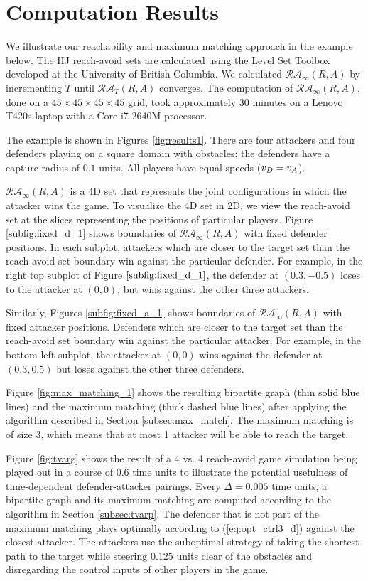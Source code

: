 \section{Computation Results}
\label{sec:results}
We illustrate our reachability and maximum matching approach in the example below. The HJ reach-avoid sets are calculated using the Level Set Toolbox \cite{LSToolbox} developed at the University of British Columbia. We calculated $\mathcal{RA}_\infty(R,A)$ by incrementing $T$ until $\mathcal{RA}_T(R,A)$ converges. The computation of $\mathcal{RA}_\infty(R,A)$, done on a $45\times45\times45\times45$ grid, took approximately 30 minutes on a Lenovo T420s laptop with a Core i7-2640M processor. 

The example is shown in Figures \ref{fig:results1}. There are four attackers and four defenders playing on a square domain with obstacles; the defenders have a capture radius of $0.1$ units. All players have equal speeds ($v_D=v_A$). 

$\mathcal{RA}_\infty(R,A)$ is a 4D set that represents the joint configurations in which the attacker wins the game. To visualize the 4D set in 2D, we view the reach-avoid set at the slices representing the positions of particular players. Figure \ref{subfig:fixed_d_1} shows boundaries of $\mathcal{RA}_\infty(R,A)$ with fixed defender positions. In each subplot, attackers which are closer to the target set than the reach-avoid set boundary win against the particular defender. For example, in the right top subplot of Figure $\ref{subfig:fixed_d_1}$, the defender at $(0.3,-0.5)$ loses to the attacker at $(0,0)$, but wins against the other three attackers. 

Similarly, Figures \ref{subfig:fixed_a_1} shows boundaries of $\mathcal{RA}_\infty(R,A)$ with fixed attacker positions. Defenders which are closer to the target set than the reach-avoid set boundary win against the particular attacker. For example, in the bottom left subplot, the attacker at $(0, 0)$ wins against the defender at $(0.3, 0.5)$ but loses against the other three defenders.

Figure \ref{fig:max_matching_1} shows the resulting bipartite graph (thin solid blue lines) and the maximum matching (thick dashed blue lines) after applying the algorithm described in Section \ref{subsec:max_match}. The maximum matching is of size 3, which means that at most 1 attacker will be able to reach the target. 

Figure \ref{fig:tvarg} shows the result of a 4 vs. 4 reach-avoid game simulation being played out in a course of 0.6 time units to illustrate the potential usefulness of time-dependent defender-attacker pairings. Every $\Delta=0.005$ time units, a bipartite graph and its maximum matching are computed according to the algorithm in Section \ref{subsec:tvarp}. The defender that is not part of the maximum matching plays optimally according to (\ref{eq:opt_ctrl3_d}) against the closest attacker. The attackers use the suboptimal strategy of taking the shortest path to the target while steering $0.125$ units clear of the obstacles and disregarding the control inputs of other players in the game.

